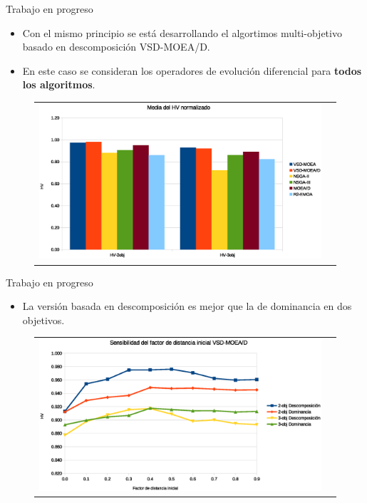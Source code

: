 \documentclass{beamer}
\begin{document}
\begin{frame}{Trabajo en progreso}
\begin{itemize}
\scriptsize
    \item Con el mismo principio se está desarrollando el algortimos multi-objetivo basado en descomposición VSD-MOEA/D.
    \item En este caso se consideran los operadores de evolución diferencial para \textbf{todos los algoritmos}.
\end{itemize}
\begin{figure}
\centering
\begin{tabular}{cc}
\includegraphics[scale=0.4]{Images/general_mean_HV.eps} 
\end{tabular}
\end{figure}
\end{frame}

\begin{frame}{Trabajo en progreso}
\begin{itemize}
    \item La versión basada en descomposición es mejor que la de dominancia en dos objetivos.
\end{itemize}
\begin{figure}
\centering
\begin{tabular}{cc}
\includegraphics[scale=0.4]{Images/factor_inicial.eps} 
\end{tabular}
\end{figure}

\end{frame}
\end{document}
